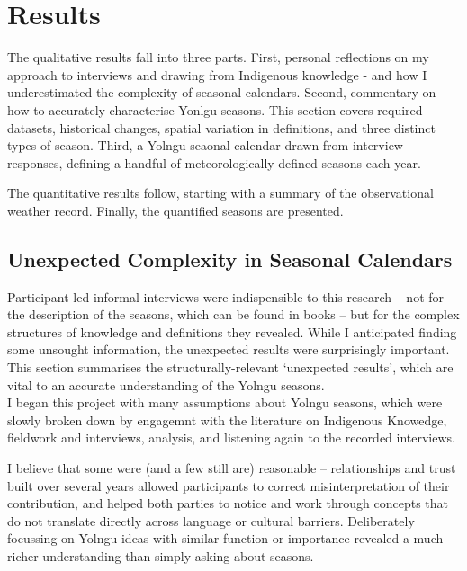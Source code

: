 \chapter{Results}
\label{ch:results}

The qualitative results fall into three parts.
%
First, personal reflections on my approach to interviews and drawing
from Indigenous knowledge - and how I underestimated the complexity
of seasonal calendars.
%
Second, commentary on how to accurately characterise Yonlgu seasons.
This section covers required datasets, historical changes, spatial
variation in definitions, and three distinct types of season.
%
Third, a Yolngu seaonal calendar drawn from interview responses,
defining a handful of meteorologically-defined seasons each year.

The quantitative results follow, starting with a summary of the
observational weather record.  Finally, the quantified seasons are
presented.



\section{Unexpected Complexity in Seasonal Calendars}
\label{sec:complex-seasons}

Participant-led informal interviews were indispensible to this research --
not for the description of the seasons, which can be found in books
\citep[eg.][]{davis1989,atlas2014} -- but for the complex structures
of knowledge and definitions they revealed.  While I anticipated finding
some unsought information, the unexpected results were surprisingly important.
This section summarises the structurally-relevant `unexpected results',
which are vital to an accurate understanding of the Yolngu seasons.\\


I began this project with many assumptions about Yolngu seasons, which were
slowly broken down by engagemnt with the literature on Indigenous Knowedge,
fieldwork and interviews, analysis, and listening again to the recorded
interviews.

I believe that some were (and a few still are) reasonable -- relationships
and trust built over several years allowed participants to correct
misinterpretation of their contribution, and helped both parties to notice
and work through concepts that do not translate directly across language or
cultural barriers.  Deliberately focussing on Yolngu ideas with similar
function or importance revealed a much richer understanding than
simply asking about seasons.

